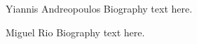\documentclass[journal]{IEEEtran}
\begin{document}
\begin{IEEEbiography}{Yiannis Andreopoulos}
Biography text here.
\end{IEEEbiography}

\begin{IEEEbiography}{Miguel Rio}
Biography text here.
\end{IEEEbiography}









\end{document}
